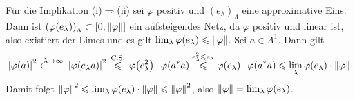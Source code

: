 \begin{beweis}
	Für die Implikation (i)$\Rightarrow$(ii) sei $\varphi$ positiv und $(e_\lambda)_\Lambda$ eine approximative Eins. 
	Dann ist $\enbrace*{\varphi(e_\lambda)}_\Lambda \subset \benbrace*{0,\norm*{\varphi}}$ ein aufsteigendes Netz, da $\varphi$ positiv und linear ist, also existiert der Limes und es gilt $\lim_\lambda \varphi(e_\lambda) \le \norm*{\varphi}$. 
	Sei $a \in A^1$. Dann gilt
	\[
		\abs*{\varphi(a)}^2 \grenzwl{\lambda\to\infty} \abs*{\varphi(e_\lambda a)}^2\, \StackText{C.S.}{\le}\, \varphi \enbrace*{e_\lambda^2} \cdot \varphi(a^*a) \stackrel{e_\lambda^2 \le e_\lambda}{\le} \varphi(e_\lambda) \cdot \varphi(a^*a) \le \lim_\lambda \varphi(e_\lambda) \cdot \norm*{\varphi}
	\]
	Damit folgt $\norm*{\varphi}^2 \le \lim_\lambda \varphi(e_\lambda) \cdot \norm*{\varphi} \le \norm*{\varphi}^2$, also $\norm*{\varphi}=\lim_\lambda \varphi(e_\lambda)$.
	

\end{beweis}
